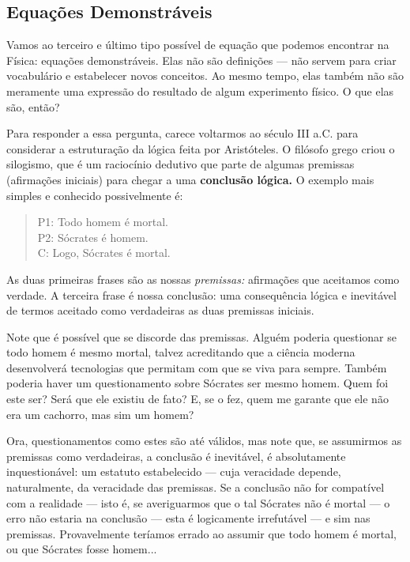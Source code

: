 \subsection{Equações Demonstráveis}

Vamos ao terceiro e último tipo possível de equação que podemos encontrar na Física: equações demonstráveis. Elas não são definições --- não servem para criar vocabulário e estabelecer novos conceitos. Ao mesmo tempo, elas também não são meramente uma expressão do resultado de algum experimento físico. O que elas são, então?

Para responder a essa pergunta, carece voltarmos ao século III a.C. para considerar a estruturação da lógica feita por Aristóteles. O filósofo grego criou o silogismo, que é um raciocínio dedutivo que parte de algumas premissas (afirmações iniciais) para chegar a uma \textbf{conclusão lógica.} O exemplo mais simples e conhecido possivelmente é: 

\begin{quote}
    P1: Todo homem é mortal.\\
    P2: Sócrates é homem.\\
    C: Logo, Sócrates é mortal.
\end{quote}


As duas primeiras frases são as nossas \textit{premissas:} afirmações que aceitamos como verdade. A terceira frase é nossa conclusão: uma consequência lógica e inevitável de termos aceitado como verdadeiras as duas premissas iniciais.

Note que é possível que se discorde das premissas. Alguém poderia questionar se todo homem é mesmo mortal, talvez acreditando que a ciência moderna desenvolverá tecnologias que permitam com que se viva para sempre. Também poderia haver um questionamento sobre Sócrates ser mesmo homem. Quem foi este ser? Será que ele existiu de fato? E, se o fez, quem me garante que ele não era um cachorro, mas sim um homem?

Ora, questionamentos como estes são até válidos, mas note que, se assumirmos as premissas como verdadeiras, a conclusão é inevitável, é absolutamente inquestionável: um estatuto estabelecido --- cuja veracidade depende, naturalmente, da veracidade das premissas. Se a conclusão não for compatível com a realidade --- isto é, se averiguarmos que o tal Sócrates não é mortal --- o erro não estaria na conclusão --- esta é logicamente irrefutável --- e sim nas premissas. Provavelmente teríamos errado ao assumir que todo homem é mortal, ou que Sócrates fosse homem...

